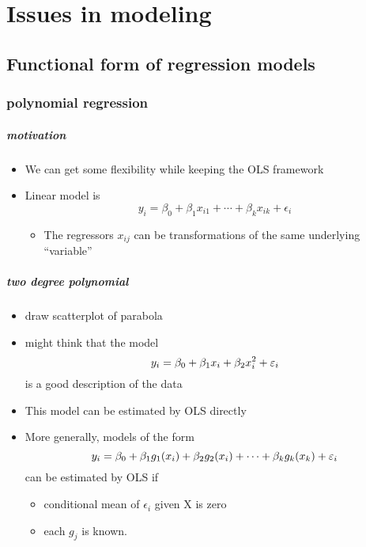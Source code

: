 

\chapter{Issues in modeling}

\section{Functional form of regression models}
\subsection{polynomial regression}

\paragraph{motivation}

\begin{itemize}
\item We can get some flexibility while keeping the OLS framework
\item Linear model is
  \[y_i = \beta_0 + \beta_1 x_{i1} + \cdots + \beta_k x_{ik} + \epsilon_i\]
\begin{itemize}
\item The regressors $x_{ij}$ can be transformations of the same
          underlying ``variable''
\end{itemize}
\end{itemize}

\paragraph{two degree polynomial}
\begin{itemize}
\item draw scatterplot of parabola
\item might think that the model
  \[y_i = \beta_0 + \beta_1 x_i + \beta_2 x^2_i + \varepsilon_i\]
  is a good description of the data
\item This model can be estimated by OLS directly
\item More generally, models of the form
  \[y_i = \beta_0 + \beta_1 g_1(x_i) + \beta_2 g_2(x_i) + \cdots + \beta_k g_k(x_k) + \varepsilon_i\]
  can be estimated by OLS if
\begin{itemize}
\item conditional mean of $\epsilon_i$ given X is zero
\item each $g_j$ is known.
\end{itemize}
\end{itemize}

